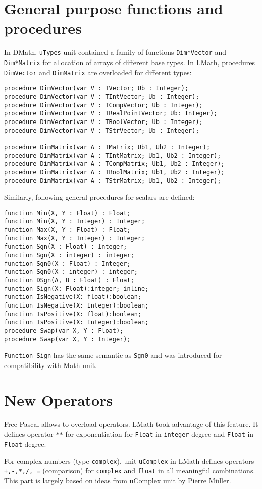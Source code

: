 \documentclass[12pt,a4paper,oneside]{article}
\newcommand{\code}[1]{\texttt{#1}}
\begin{document}
\section{General purpose functions and procedures}
In DMath, \code{uTypes} unit contained a family of functions \code{Dim*Vector} and \code{Dim*Matrix} for allocation of arrays of different base types. In LMath, procedures \code{DimVector} and \code{DimMatrix} are overloaded for different types:
\begin{verbatim}
procedure DimVector(var V : TVector; Ub : Integer); 
procedure DimVector(var V : TIntVector; Ub : Integer);
procedure DimVector(var V : TCompVector; Ub : Integer);
procedure DimVector(var V : TRealPointVector; Ub: Integer);
procedure DimVector(var V : TBoolVector; Ub : Integer);
procedure DimVector(var V : TStrVector; Ub : Integer); 	

procedure DimMatrix(var A : TMatrix; Ub1, Ub2 : Integer);
procedure DimMatrix(var A : TIntMatrix; Ub1, Ub2 : Integer);
procedure DimMatrix(var A : TCompMatrix; Ub1, Ub2 : Integer);
procedure DimMatrix(var A : TBoolMatrix; Ub1, Ub2 : Integer);
procedure DimMatrix(var A : TStrMatrix; Ub1, Ub2 : Integer);
\end{verbatim}
Similarly, following general procedures for scalars are defined:
\begin{verbatim}
function Min(X, Y : Float) : Float;
function Min(X, Y : Integer) : Integer;
function Max(X, Y : Float) : Float;
function Max(X, Y : Integer) : Integer;
function Sgn(X : Float) : Integer;
function Sgn(X : integer) : integer; 
function Sgn0(X : Float) : Integer;
function Sgn0(X : integer) : integer;
function DSgn(A, B : Float) : Float;
function Sign(X: Float):integer; inline;
function IsNegative(X: float):boolean;
function IsNegative(X: Integer):boolean;
function IsPositive(X: float):boolean;
function IsPositive(X: Integer):boolean; 
procedure Swap(var X, Y : Float);
procedure Swap(var X, Y : Integer);
\end{verbatim}
\code{Function Sign} has the same semantic as \code{Sgn0} and was introduced for compatibility with Math unit.
\section{New Operators}
Free Pascal allows to overload operators. LMath took advantage of this feature. It defines operator \code{**} for exponentiation for \code{Float} in \code{integer} degree and \code{Float} in \code{Float} degree.

For complex numbers (type \code{complex}), unit \code{uComplex} in LMath defines  operators \code{+,-,*,/, =} (comparison) for \code{complex} and \code{float} in all meaningful combinations. This part is largely based on ideas from uComplex unit by Pierre Müller.
\end{document}
